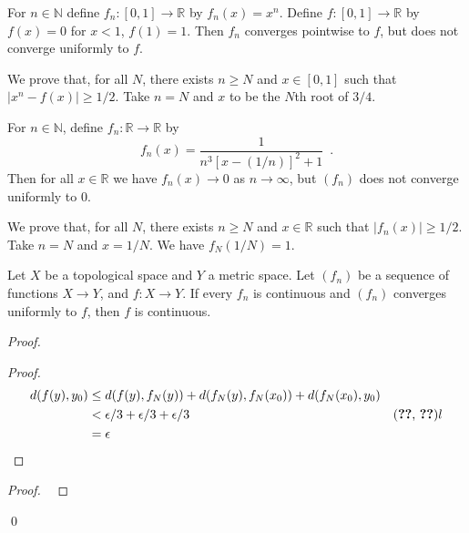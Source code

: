 \begin{ex}
For $n \in \mathbb{N}$ define $f_n : [0,1] \rightarrow \mathbb{R}$ by $f_n(x) = x^n$. Define $f : [0,1] \rightarrow \mathbb{R}$ by $f(x) = 0$ for $x < 1$, $f(1) = 1$. Then $f_n$ converges pointwise to $f$, but does not converge uniformly to $f$.

We prove that, for all $N$, there exists $n \geq N$ and $x \in [0,1]$ such that $|x^n - f(x)| \geq 1/2$. Take $n = N$ and $x$ to be the $N$th root of $3/4$.
\end{ex}

\begin{ex}
For $n \in \mathbb{N}$, define $f_n : \mathbb{R} \rightarrow \mathbb{R}$ by
\[ f_n(x) = \frac{1}{n^3[x-(1/n)]^2 + 1} \enspace . \]
Then for all $x \in \mathbb{R}$ we have $f_n(x) \rightarrow 0$ as $n \rightarrow \infty$, but $(f_n)$ does not converge uniformly to 0.

We prove that, for all $N$, there exists $n \geq N$ and $x \in \mathbb{R}$ such that $|f_n(x)| \geq 1/2$. Take $n = N$ and $x = 1/N$. We have $f_N(1/N) = 1$.
\end{ex}

\begin{thm}
Let $X$ be a topological space and $Y$ a metric space. Let $(f_n)$ be a sequence of functions $X \rightarrow Y$, and $f : X \rightarrow Y$. If every $f_n$ is continuous and $(f_n)$ converges uniformly to $f$, then $f$ is continuous.
\end{thm}

\begin{proof}
\pf
{}
\begin{proof}
	\pf
	\begin{align*}
		d(f(y),y_0) & \leq d(f(y),f_N(y)) + d(f_N(y),f_N(x_0)) + d(f_N(x_0),y_0) \\
		& < \epsilon / 3 + \epsilon / 3 + \epsilon / 3 & (\text{\stepref{5}, \stepref{7}}) l\\
		& = \epsilon
	\end{align*}
\end{proof}
\begin{proof}
	\pf\ 
\end{proof}
\qed
\end{proof}

